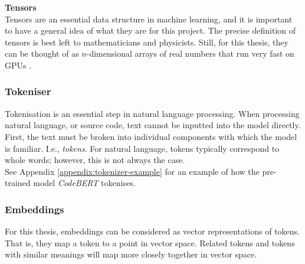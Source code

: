 \noindent
\textbf{Tensors}\\

\noindent
Tensors are an essential data structure in machine learning, and it is important to have a general idea of what they are for this project. The precise definition of tensors is best left to mathematicians and physicists. Still, for this thesis, they can be thought of as $n$-dimensional arrays of real numbers that run very fast on GPUs \cite{deeplearning_mit}.


\subsubsection{Tokeniser}

Tokenisation is an essential step in natural language processing. When processing natural language, or source code, text cannot be inputted into the model directly. First, the text must be broken into individual components with which the model is familiar. I.e., \emph{tokens}. For natural language, tokens typically correspond to whole words; however, this is not always the case. \\

%

\noindent
See Appendix \ref{appendix:tokenizer-example} for an example of how the pre-trained model \emph{CodeBERT} tokenises.

\subsubsection{Embeddings}

\noindent
For this thesis, embeddings can be considered as vector representations of tokens. That is, they map a token to a point in vector space. Related tokens and tokens with similar meanings will map more closely together in vector space. \\


